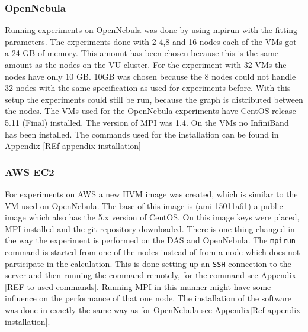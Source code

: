 \subsubsection{OpenNebula}
Running experiments on OpenNebula was done by using mpirun with the fitting parameters. The experiments done with 2 4,8 and 16 nodes each of the VMs got a 24 GB of memory. This amount has been chosen because this is the same amount as the nodes on the VU cluster. For the experiment with 32 VMs the nodes have only 10 GB. 10GB was chosen because the 8 nodes could not handle 32 nodes with the same specification as used for experiments before. With this setup the experiments could still be run, because the graph is distributed between the nodes. The VMs used for the OpenNebula experiments have CentOS release 5.11 (Final) installed. The version of MPI was 1.4. On the VMs no InfiniBand has been installed. The commands used for the installation can be found in Appendix [REf appendix installation]

\subsubsection{AWS EC2}
For experiments on AWS a new HVM image was created, which is similar to the VM used on OpenNebula. The base of this image is (ami-15011a61) a public image which also has the 5.x version of CentOS. On this image keys were placed, MPI installed and the git repository downloaded. There is one thing changed in the way the experiment is performed on the DAS and OpenNebula. The \texttt{mpirun} command is started from one of the nodes instead of from a node which does not participate in the calculation. This is done setting up an \texttt{SSH} connection to the server and then running the command remotely, for the command see Appendix [REF to used commands]. Running MPI in this manner might have some influence on the performance of that one node. The installation of the software was done in exactly the same way as for OpenNebula see Appendix[Ref appendix installation].

